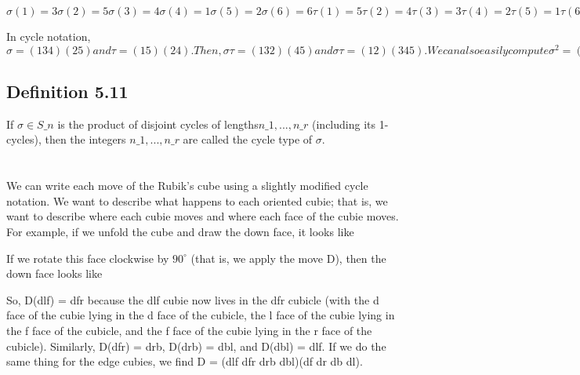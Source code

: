 $\sigma(1) = 3 \sigma(2) = 5 \sigma(3) = 4 \sigma(4) = 1 \sigma(5) = 2 \sigma(6) = 6
\tau(1) = 5 \tau(2) = 4 \tau(3) = 3 \tau(4) = 2 \tau(5) = 1 \tau(6) = 6$

In cycle notation, $\sigma = (1 3 4)(2 5) and \tau = (1 5)(2 4). Then, \sigma \tau= (1 3 2) (4 5) and \sigma \tau= (1 2)(3 4 5). We
can also easily compute \sigma^2 = (1 4 3) and \tau^2 = 1.$

\subsection{Definition 5.11} If $\sigma \in S\_n$ is the product of disjoint cycles of lengths$ n\_1, . . . , n\_r$ (including its 1-cycles),
then the integers $n\_1, . . . , n\_r$ are called the cycle type of $\sigma.$

\section{\rubik{}}

We can write each move of the Rubik's cube using a slightly modified cycle notation. We want to describe
what happens to each oriented cubie; that is, we want to describe where each cubie moves and where each
face of the cubie moves. For example, if we unfold the cube and draw the down face, it looks like

If we rotate this face clockwise by $90^\circ$ (that is, we apply the move D), then the down face looks like

So, D(dlf) = dfr because the dlf cubie now lives in the dfr cubicle (with the d face of the cubie lying in the d
face of the cubicle, the l face of the cubie lying in the f face of the cubicle, and the f face of the cubie lying
in the r face of the cubicle). Similarly, D(dfr) = drb, D(drb) = dbl, and D(dbl) = dlf. If we do the same thing
for the edge cubies, we find D = (dlf dfr drb dbl)(df dr db dl).

\myTail{
}
%